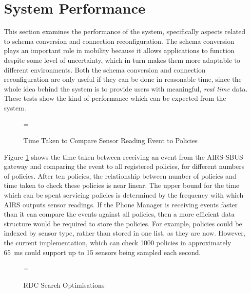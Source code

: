 \documentclass[12pt,twoside,notitlepage]{report}
\begin{document}



\section{System Performance}

This section examines the performance of the system, specifically aspects related to schema conversion and connection reconfiguration.  
The schema conversion plays an important role in mobility because it allows applications to function despite some level of uncertainty, which in turn makes them more adaptable to different environments. 
Both the schema conversion and connection reconfiguration are only useful if they can be done in reasonable time, since the whole idea behind the system is to provide users with meaningful, {\sl real time} data. 
These tests show the kind of performance which can be expected from the system. 

\begin{figure}
\epsfxsize=\hsize
\centerline{}
\caption{Time Taken to Compare Sensor Reading Event to Policies}
\label{fig:policy_times}
\end{figure}

Figure \ref{fig:policy_times} shows the time taken between receiving an event from the AIRS-SBUS gateway and comparing the event to all registered policies, for different numbers of policies. 
After ten policies, the relationship between number of policies and time taken to check these policies is near linear. 
The upper bound for the time which can be spent servicing policies is determined by the frequency with which AIRS outputs sensor readings. 
If the Phone Manager is receiving events faster than it can compare the events against all policies, then a more efficient data structure would be required to store the policies. 
For example, policies could be indexed by sensor type, rather than stored in one list, as they are now. 
However, the current implementation, which can check 1000 policies in approximately \SI{65}{\milli\second} could support up to 15 sensors being sampled each second. 

\begin{figure}
\epsfxsize=\hsize
\centerline{}
\caption{RDC Search Optimisations}
\label{fig:rdc_search_optimisations}
\end{figure}
\end{document}
